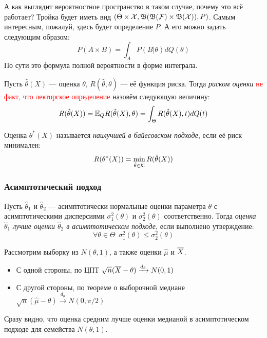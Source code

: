 \begin{anote}
	А как выглядит вероятностное пространство в таком случае, почему это всё работает? Тройка будет иметь вид $(\Theta \times \mathcal{X}, \mathfrak{B}(\mathfrak{B}(\mathcal{F})\times \mathfrak{B}(\mathcal{X})), P)$. Самым интересным, пожалуй, здесь будет определение $P$. А его можно задать следующим образом:
	\[
		P(A \times B) = \int_A P(B | \theta)dQ(\theta)
	\]
	По сути это формула полной вероятности в форме интеграла.
\end{anote}

\begin{definition}
	Пусть $\hat{\theta}(X)$ --- оценка $\theta$, $R(\hat{\theta}, \theta)$ --- её функция риска. Тогда \textit{риском оценки} \textcolor{red}{не факт, что лекторское определение} назовём следующую величину:
	\[
		R(\hat{\theta}(X)) = \mathbb{E}_Q R(\hat{\theta}(X), \theta) = \int_\Theta R(\hat{\theta}(X), t) dQ(t)
	\]
\end{definition}

\begin{definition}
	Оценка $\theta^*(X)$ называется \textit{наилучшей в байесовском подходе}, если её риск минимален:
	\[
		R(\theta^*(X)) = \min_{\hat{\theta} \in \mathcal{K}} R(\hat{\theta}(X))
	\]
\end{definition}

\subsubsection{Асимптотический подход}

\begin{definition}
	Пусть $\hat{\theta}_1$ и $\hat{\theta}_2$ --- асимптотически нормальные оценки параметра $\theta$ с асимптотическими дисперсиями $\sigma_1^2(\theta)$ и $\sigma_2^2(\theta)$ соответственно. Тогда \textit{оценка $\hat{\theta}_1$ лучше оценки $\hat{\theta}_2$ в асимптотическом подходе}, если выполнено утверждение:
	\[
		\forall \theta \in \Theta\ \ \sigma_1^2(\theta) \le \sigma_2^2(\theta)
	\]
\end{definition}

\begin{example}
	Рассмотрим выборку из $N(\theta, 1)$, а также оценки $\hat{\mu}$ и $\overline{X}$.
	\begin{itemize}
		\item С одной стороны, по ЦПТ $\sqrt{n}(\overline{X} - \theta) \xrightarrow{d_\theta} N(0, 1)$
		
		\item С другой стороны, по теореме о выборочной медиане $\sqrt{n}(\hat{\mu} - \theta) \xrightarrow{d_{\theta}} N(0, \pi / 2)$
	\end{itemize}
	Сразу видно, что оценка средним лучше оценки медианой в асимптотическом подходе для семейства $N(\theta, 1)$.
\end{example}

